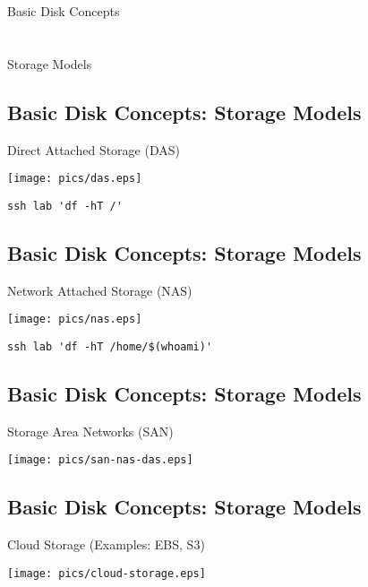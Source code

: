 \documentclass[xga]{xdvislides}
\begin{document}
\newpage
\vspace*{\fill}
\begin{center}
	\Hugesize
		Basic Disk Concepts \\ [1em]
	\hspace*{5mm}
	\blueline\\
	\hspace*{5mm}\\
		Storage Models
\end{center}
\vspace*{\fill}

\subsection{Basic Disk Concepts: Storage Models}
Direct Attached Storage (DAS)
\vfill
\begin{center}
	\texttt{[image: pics/das.eps]} \\
\end{center}
\verb+ssh lab 'df -hT /'+
\vfill

\subsection{Basic Disk Concepts: Storage Models}
Network Attached Storage (NAS)
\vfill
\begin{center}
	\texttt{[image: pics/nas.eps]} \\
\end{center}
\verb+ssh lab 'df -hT /home/$(whoami)'+
\vfill

\subsection{Basic Disk Concepts: Storage Models}
Storage Area Networks (SAN)
\vfill
\begin{center}
	\texttt{[image: pics/san-nas-das.eps]} \\
\end{center}
\vfill

\subsection{Basic Disk Concepts: Storage Models}
Cloud Storage (Examples: EBS, S3)
\vfill
\begin{center}
	\texttt{[image: pics/cloud-storage.eps]} \\
\end{center}
\vfill
\end{document}
